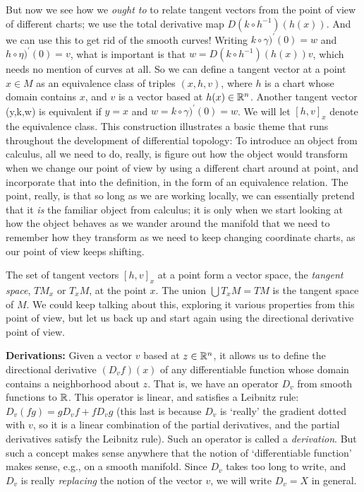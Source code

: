 \msk

But now we see how we {\it ought to} to relate tangent vectors from the point of view of different charts;
we use the total derivative map $D(k\circ h^{-1})(h(x))$. And we can use this to get rid of the smooth curves!
Writing $k\circ\gamma)^\prime(0)=w$ and $h\circ\eta)^\prime(0)=v$, what is important is that
$w=D(k\circ h^{-1})(h(x))v$, which needs no mention of curves at all. So we can define
a tangent vector at a point $x\in M$ as an equivalence class of triples $(x,h,v)$, where
$h$ is a chart whose domain contains $x$, and $v$ is a vector based at $h(x)\in {\Bbb R}^n$.
Another tangent vector (y,k,w) is equivalent if
$y=x$ and $w=k\circ\gamma)^\prime(0)=w$. We will let $[h,v]_x$ denote the equivalence class.
This construction illustrates a basic theme that runs throughout the development of 
differential topology: To introduce an object from calculus, all we need to 
do, really, is figure out how the object would transform when we change our point of view by using
a different chart around at point, and incorporate that into the definition, in the form of an
equivalence relation. The point, really, is that so long as we are working locally, we can essentially
pretend that it {\it is} the familiar object from calculus; it is only when we start looking at how
the object behaves as we wander around the manifold that we need to remember how they transform
as we need to keep changing coordinate charts, as our point of view keeps shifting.

The set of tangent vectors $[h,v]_x$ at a point form a vector space, the {\it tangent space},
$TM_x$ or $T_xM$, at the point $x$. The union $\bigcup T_xM=TM$ is the tangent space of $M$. We
could keep talking about this, exploring it various properties from this point of view, but let us
back up and start again using the directional derivative point of view.

\msk

{\bf Derivations:} Given a vector $v$ based at $z\in {\Bbb R}^n$, it allows us to define the directional
derivative $(D_vf)(x)$ of any differentiable function whose domain contains a neighborhood about $z$.
That is, we have an operator $D_v$ from smooth functions to ${\Bbb R}$. This operator is linear, and
satisfies a Leibnitz rule: $D_v(fg)=gD_vf+fD_vg$ (this last is because $D_v$ is `really'
the gradient dotted with $v$, so it is a linear combination of the partial derivatives, and
the partial derivatives satisfy the Leibnitz rule). Such an operator is called a {\it derivation}.
But such a concept makes sense anywhere that the notion of `differentiable function' makes sense,
e.g., on a smooth manifold. Since $D_v$ takes too long to write, and $D_v$ is really {\it replacing} 
the notion of the vector $v$, we will write $D_v=X$ in general.


